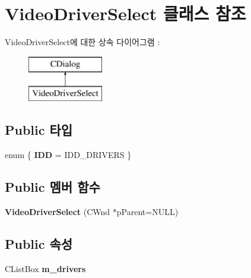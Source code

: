 \hypertarget{class_video_driver_select}{}\section{Video\+Driver\+Select 클래스 참조}
\label{class_video_driver_select}
Video\+Driver\+Select에 대한 상속 다이어그램 \+: \begin{figure}[H]
\begin{center}
\leavevmode
\includegraphics[height=2.000000cm]{class_video_driver_select}
\end{center}
\end{figure}
\subsection*{Public 타입}
\begin{DoxyCompactItemize}
\item 
\mbox{\label{class_video_driver_select_aca4a8f04ceb8dbf7c359c6c185573af6}} 
enum \{ {\bfseries I\+DD} = I\+D\+D\+\_\+\+D\+R\+I\+V\+E\+RS
 \}
\end{DoxyCompactItemize}
\subsection*{Public 멤버 함수}
\begin{DoxyCompactItemize}
\item 
\mbox{\label{class_video_driver_select_aca923e596b34b0189bb365ef0850dada}} 
{\bfseries Video\+Driver\+Select} (C\+Wnd $\ast$p\+Parent=N\+U\+LL)
\end{DoxyCompactItemize}
\subsection*{Public 속성}
\begin{DoxyCompactItemize}
\item 
\mbox{\label{class_video_driver_select_a6f3953363969c0e8a4c52f6247fb41d9}} 
C\+List\+Box {\bfseries m\+\_\+drivers}
\end{DoxyCompactItemize}
